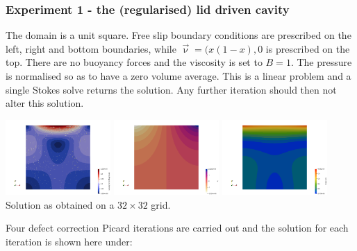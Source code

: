 \newpage
\subsubsection*{Experiment 1 - the (regularised) lid driven cavity}

The domain is a unit square. Free slip boundary conditions are prescribed on the 
left, right and bottom boundaries, while $\vec\upnu=(x(1-x),0$ is prescribed on the 
top. There are no buoyancy forces and the viscosity is set to $B=1$. 
The pressure is normalised so as to have a zero volume average. 
This is a linear problem and a single Stokes solve returns the solution. Any further 
iteration should then not alter this solution. 

\begin{center}
\includegraphics[width=4cm]{python_codes/fieldstone_87/results/experiment_00/vel}
\includegraphics[width=4cm]{python_codes/fieldstone_87/results/experiment_00/p}
\includegraphics[width=4cm]{python_codes/fieldstone_87/results/experiment_00/sr}\\
{\captionfont Solution as obtained on a $32\times 32$ grid.}
\end{center}

\noindent Four defect correction Picard iterations are carried out and the solution for 
each iteration is shown here under:  

